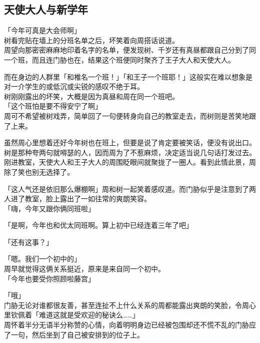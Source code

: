 \subsection{天使大人与新学年}

「今年可真是大会师啊」\\

树看完贴在墙上的分班名单之后，坏笑着向周搭话说道。\\

周望向那密密麻麻地印着名字的名单，便发现树、千岁还有真昼都跟自己分到了同一个班，而且连门胁也在，结果这个班便同时聚齐了王子大人和天使大人。

而在身边的人群里「和椎名一个班！」「和王子一个班耶！」这般实在难以想象是对一介学生的或低沉或尖锐的感叹不绝于耳。\\

树刚刚露出的坏笑，大概是因为真昼和周在同一个班吧。\\

「这个班怕是要不得安宁了啊」\\

周可不希望被树戏弄，简单回了一句便转身向自己的教室走去，而树则是苦笑地跟了上来。

虽然周心里想着还好今年树也在班上，但要是说了肯定要被笑话，便没有说出口。树是那种夸两句就嘚瑟的人，因而周为了不惹麻烦，决定适当说几句话打发过去。\\

刚进教室，天使大人和王子大人的周围眨眼间就聚拢了一圈人。看到此情此景，周除了笑也别无选择了。

「这人气还是依旧那么爆棚啊」周和树一起笑着感叹道。而门胁似乎是注意到了两人进了教室，脸上露出了一如往常的爽朗笑容。\\

「嗨，今年又跟你俩同班啦」

「是啊，今年也和优太同班啊。算上初中已经连着三年了吧」

「还有这事？」

「嗯。我们一个初中的」\\

周早就觉得这俩关系挺近，原来是来自同一个初中。\\

「今年也要受你照顾啦藤宫」

「哦」\\

门胁无论对谁都很友善，甚至连扯不上什么关系的周都能露出爽朗的笑脸，令周心里钦佩着「难道这就是受欢迎的秘诀么……」\\

周怀着半分无语半分称赞的心情，向着明明身边已经被包围却还不慌不乱的门胁应了一句，然后坐到了自己被安排到的位子上。\\


